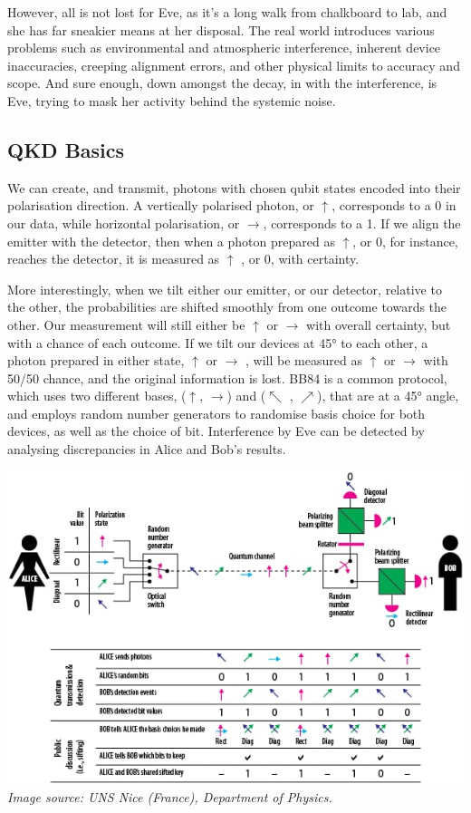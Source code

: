 \documentclass[journal]{vgtc}
\begin{document}
However, all is not lost for Eve, as it’s a long walk from
chalkboard to lab, and she has far sneakier means at her
disposal.
The real world introduces various problems such as
environmental and atmospheric interference, inherent
device inaccuracies, creeping alignment errors, and other
physical limits to accuracy and scope. And sure enough, down amongst the decay, in with the
interference, is Eve, trying to mask her activity behind the systemic noise.

\begin{tcolorbox}
\section*{QKD Basics}

We can create, and transmit, photons with chosen qubit states encoded into their polarisation direction. A vertically polarised photon, or $\uparrow$, corresponds to a 0 in our data, while horizontal polarisation, or $\rightarrow$, corresponds to a 1. If we align the emitter with the detector, then when a photon prepared as $\uparrow$, or 0, for instance, reaches the detector, it is measured as $\uparrow$ , or 0, with certainty.

More interestingly, when we tilt either our emitter, or our detector, relative to the other, the probabilities are shifted smoothly from one outcome towards the other. Our measurement will still either be $\uparrow$ or $\rightarrow$ with overall certainty, but with a chance of each outcome. If we tilt our devices at \ang{45} to each other, a photon prepared in either state, $\uparrow$ or $\rightarrow$ , will be measured as $\uparrow$ or $\rightarrow$ with 50/50 chance, and the original information is lost. BB84 is a common protocol, which uses two different bases, ($\uparrow$, $\rightarrow$) and ($\nwarrow$ , $\nearrow$), that are at a \ang{45} angle, and employs random number generators to randomise basis choice for both devices, as well as the choice of bit. Interference by Eve can be detected by analysing discrepancies in Alice and Bob's results. 

\includegraphics[width=\linewidth]{Box_2}
\textit{Image source: UNS Nice (France), Department of Physics.}

\end{tcolorbox}
\end{document}
